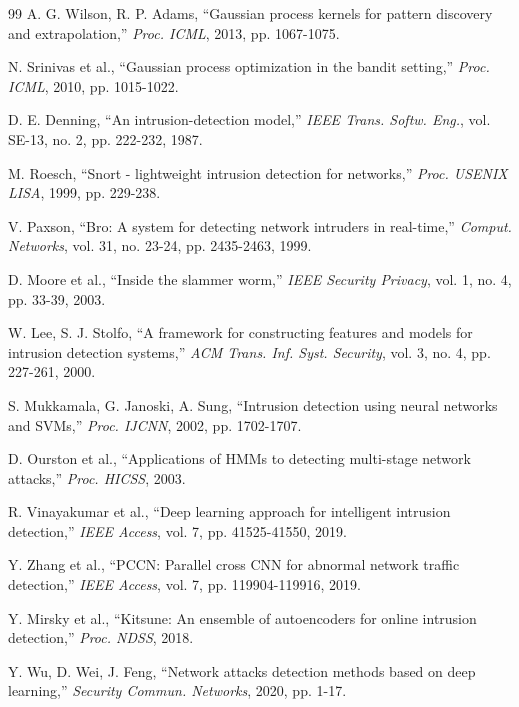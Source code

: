 \documentclass[review,12pt]{elsarticle}
\begin{document}
\begin{thebibliography}{99}
A. G. Wilson, R. P. Adams, ``Gaussian process kernels for pattern discovery and extrapolation,'' \textit{Proc. ICML}, 2013, pp. 1067-1075.

N. Srinivas et al., ``Gaussian process optimization in the bandit setting,'' \textit{Proc. ICML}, 2010, pp. 1015-1022.

D. E. Denning, ``An intrusion-detection model,'' \textit{IEEE Trans. Softw. Eng.}, vol. SE-13, no. 2, pp. 222-232, 1987.

M. Roesch, ``Snort - lightweight intrusion detection for networks,'' \textit{Proc. USENIX LISA}, 1999, pp. 229-238.

V. Paxson, ``Bro: A system for detecting network intruders in real-time,'' \textit{Comput. Networks}, vol. 31, no. 23-24, pp. 2435-2463, 1999.

D. Moore et al., ``Inside the slammer worm,'' \textit{IEEE Security Privacy}, vol. 1, no. 4, pp. 33-39, 2003.

W. Lee, S. J. Stolfo, ``A framework for constructing features and models for intrusion detection systems,'' \textit{ACM Trans. Inf. Syst. Security}, vol. 3, no. 4, pp. 227-261, 2000.

S. Mukkamala, G. Janoski, A. Sung, ``Intrusion detection using neural networks and SVMs,'' \textit{Proc. IJCNN}, 2002, pp. 1702-1707.

D. Ourston et al., ``Applications of HMMs to detecting multi-stage network attacks,'' \textit{Proc. HICSS}, 2003.

R. Vinayakumar et al., ``Deep learning approach for intelligent intrusion detection,'' \textit{IEEE Access}, vol. 7, pp. 41525-41550, 2019.

Y. Zhang et al., ``PCCN: Parallel cross CNN for abnormal network traffic detection,'' \textit{IEEE Access}, vol. 7, pp. 119904-119916, 2019.

Y. Mirsky et al., ``Kitsune: An ensemble of autoencoders for online intrusion detection,'' \textit{Proc. NDSS}, 2018.

Y. Wu, D. Wei, J. Feng, ``Network attacks detection methods based on deep learning,'' \textit{Security Commun. Networks}, 2020, pp. 1-17.


\end{thebibliography}
\end{document}
